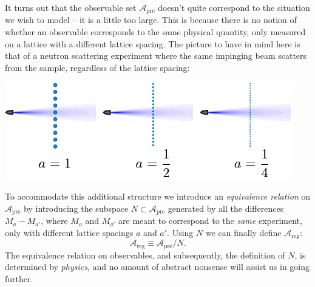 \documentclass[11pt]{amsart}
\theoremstyle{plain}%
\theoremstyle{definition}
\theoremstyle{remark}
\begin{document}
It turns out that the observable set $\mathcal{A}_{\text{pre}}$ doesn't quite correspond to the situation we wish to model -- it is a little too large. This is because there is no notion of whether an observable corresponds to the same physical quantity, only measured on a lattice with a different lattice spacing. The picture to have in mind here is that of a neutron scattering experiment where the same impinging beam scatters from the sample, regardless of the lattice spacing: 
\begin{center}
	\includegraphics{decreasea.pdf}
\end{center}
To accommodate this additional structure we introduce an \emph{equivalence relation} on $\mathcal{A}_{\text{pre}}$ by introducing the subspace $N \subset \mathcal{A}_{\text{pre}}$ generated by all the differences $M_{a}-M_{a'}$, where $M_{a}$ and $M_{a'}$ are meant to correspond to the \emph{same} experiment, only with different lattice spacings $a$ and $a'$. Using $N$ we can finally define $\mathcal{A}_{\text{reg}}$:
\begin{equation}
	\mathcal{A}_{\text{reg}} \equiv \mathcal{A}_{\text{pre}}/N.
\end{equation}
The equivalence relation on observables, and subsequently, the definition of $N$, is determined by \emph{physics}, and no amount of abstract nonsense will assist us in going further. 
\end{document}
